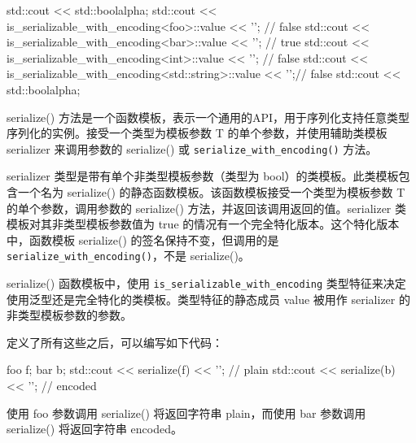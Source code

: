 \begin{cpp}
std::cout << std::boolalpha;
std::cout <<
    is_serializable_with_encoding<foo>::value << '\n';        // false
std::cout <<
    is_serializable_with_encoding<bar>::value << '\n';        // true
std::cout <<
    is_serializable_with_encoding<int>::value << '\n';        // false
std::cout <<
    is_serializable_with_encoding<std::string>::value << '\n';// false
std::cout << std::boolalpha;
\end{cpp}

serialize() 方法是一个函数模板，表示一个通用的API，用于序列化支持任意类型序列化的实例。接受一个类型为模板参数 T 的单个参数，并使用辅助类模板 serializer 来调用参数的 serialize() 或 \verb|serialize_with_encoding()| 方法。

serializer 类型是带有单个非类型模板参数（类型为 bool）的类模板。此类模板包含一个名为 serialize() 的静态函数模板。该函数模板接受一个类型为模板参数 T 的单个参数，调用参数的 serialize() 方法，并返回该调用返回的值。serializer 类模板对其非类型模板参数值为 true 的情况有一个完全特化版本。这个特化版本中，函数模板 serialize() 的签名保持不变，但调用的是 \verb|serialize_with_encoding()|，不是 serialize()。

serialize() 函数模板中，使用 \verb|is_serializable_with_encoding| 类型特征来决定使用泛型还是完全特化的类模板。类型特征的静态成员 value 被用作 serializer 的非类型模板参数的参数。

定义了所有这些之后，可以编写如下代码：

\begin{cpp}
foo f;
bar b;
std::cout << serialize(f) << '\n'; // plain
std::cout << serialize(b) << '\n'; // encoded
\end{cpp}

使用 foo 参数调用 serialize() 将返回字符串 plain，而使用 bar 参数调用 serialize() 将返回字符串 encoded。

